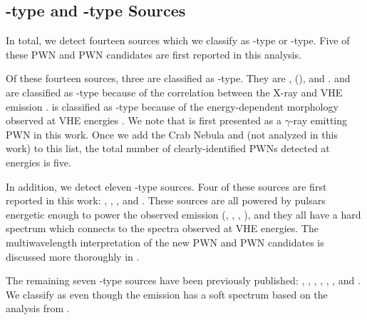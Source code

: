 \subsection{\PWNClass-type and \PWNcClass-type Sources}

In total, we detect fourteen sources which we classify as \PWNClass-type
or \PWNcClass-type. Five of these \ac{PWN} and \ac{PWN} candidates are
first reported in this analysis.

Of these fourteen sources, three are classified as \PWNClass-type.  They
are , \mshfifteenfiftytwo (), and .
 and \mshfifteenfiftytwo are classified as \PWNClass-type
because of the correlation between the X-ray and \ac{VHE} emission
\citep{h.e.s.s.collaboration_2011a_discovery-source,aharonian_2005a_discovery-extended}.
 is classified as \PWNClass-type because of
the energy-dependent morphology observed at \ac{VHE} energies
\citep{aharonian_2006a_energy-dependent}.  We note that 
is first presented as a $\gamma$-ray emitting \ac{PWN} in this work.
Once we add the Crab Nebula and \velax (not analyzed in this work) to
this list, the total number of clearly-identified \acp{PWN} detected at
\gev energies is five.

In addition, we detect eleven \PWNcClass-type sources.  Four of these
sources are first reported in this work: , ,
, and .  These sources are all powered by
pulsars energetic enough to power the observed emission (,
, , ), and they all have a hard
spectrum which connects to the spectra observed at \ac{VHE} energies.  The
multiwavelength interpretation of the new \ac{PWN} and \ac{PWN} candidates
is discussed more thoroughly in \cite{acero_2013a_constraints-galactic}.

The remaining seven \PWNcClass-type sources have been previously
published:  \citep{ackermann_2011a_fermi-lat-search},
 \citep{slane_2010a_fermi-detection}, 
\citep{lande_2012_search-spatially}, 
\citep{lande_2012_search-spatially}, 
\citep{lande_2012_search-spatially}, 
\citep{tam_2010a_search-counterparts}, and 
\citep{rousseau_2012a_fermi-lat-constraints}.  We classify 
as \PWNcClass even though the \gev emission has a soft spectrum based
on the analysis from \cite{lemoine-goumard_2011a_fermi-lat-detection}.

